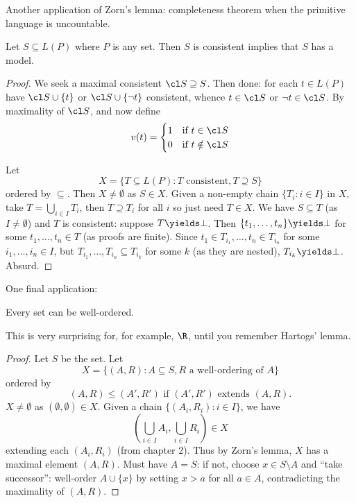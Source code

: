 \documentclass[a4paper]{article}
\begin{document}
Another application of Zorn's lemma: completeness theorem when the primitive language is uncountable.

\begin{theorem}
  Let \(S \subseteq L(P)\) where \(P\) is any set. Then \(S\) is consistent implies that \(S\) has a model.
\end{theorem}

\begin{proof}
  We seek a maximal consistent \(\cl S \supseteq S\). Then done: for each \(t \in L(P)\) have \(\cl S \cup \{t\}\) or \(\cl S \cup \{\neg t\}\) consistent, whence \(t \in \cl S\) or \(\neg t \in \cl S\). By maximality of \(\cl S\), and now define
  \begin{align*}
    v(t) =
    \begin{cases}
      1 & \text{if } t \in \cl S \\
      0 & \text{if } t \notin \cl S
    \end{cases}
  \end{align*}

  Let
  \[
    X = \{T \subseteq L(P): T \text{ consistent}, T \supseteq S\}
  \]
  ordered by \(\subseteq\). Then \(X \neq \emptyset\) as \(S \in X\). Given a non-empty chain \(\{T_i: i \in I\}\) in \(X\), take \(T = \bigcup_{i \in I} T_i\), then \(T \supseteq T_i\) for all \(i\) so just need \(T \in X\). We have \(S \subseteq T\) (as \(I \neq \emptyset\)) and \(T\) is consistent: suppose \(T \yields \bot\). Then \(\{t_1, \dots, t_n\} \yields \bot\) for some \(t_1, \dots, t_n \in T\) (as proofs are finite). Since \(t_1 \in T_{i_1}, \dots, t_n \in T_{i_n}\) for some \(i_1, \dots, i_n \in I\), but \(T_{i_1}, \dots, T_{i_n} \subseteq T_{i_k}\) for some \(k\) (as they are nested), \(T_{i_k} \yields \bot\). Absurd.
\end{proof}

One final application:

\begin{theorem}
  Every set can be well-ordered.
\end{theorem}

\begin{remark}
  This is very surprising for, for example, \(\R\), until you remember Hartogs' lemma.
\end{remark}

\begin{proof}
  Let \(S\) be the set. Let
  \[
    X = \{(A, R): A \subseteq S, R \text{ a well-ordering of } A\}
  \]
  ordered by
  \[
    (A, R) \leq (A', R') \text{ if } (A', R') \text{ extends } (A, R).
  \]
  \(X \neq \emptyset\) as \((\emptyset, \emptyset) \in X\). Given a chain \(\{(A_i, R_i): i \in I\}\), we have
  \[
    (\bigcup_{i \in I} A_i, \bigcup_{i \in I} R_i) \in X
  \]
  extending each \((A_i, R_i)\) (from chapter 2). Thus by Zorn's lemma, \(X\) has a maximal element \((A, R)\). Must have \(A = S\): if not, choose \(x \in S \setminus A\) and ``take successor'': well-order \(A \cup \{x\}\) by setting \(x > a\) for all \(a \in A\), contradicting the maximality of \((A, R)\).
\end{proof}
\end{document}
